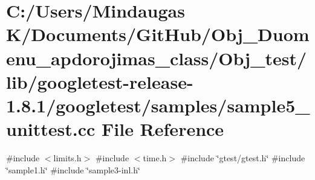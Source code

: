 \hypertarget{_obj__test_2lib_2googletest-release-1_88_81_2googletest_2samples_2sample5__unittest_8cc}{}\section{C\+:/\+Users/\+Mindaugas K/\+Documents/\+Git\+Hub/\+Obj\+\_\+\+Duomenu\+\_\+apdorojimas\+\_\+class/\+Obj\+\_\+test/lib/googletest-\/release-\/1.8.1/googletest/samples/sample5\+\_\+unittest.cc File Reference}
\label{_obj__test_2lib_2googletest-release-1_88_81_2googletest_2samples_2sample5__unittest_8cc}
{\ttfamily \#include $<$limits.\+h$>$}\newline
{\ttfamily \#include $<$time.\+h$>$}\newline
{\ttfamily \#include \char`\"{}gtest/gtest.\+h\char`\"{}}\newline
{\ttfamily \#include \char`\"{}sample1.\+h\char`\"{}}\newline
{\ttfamily \#include \char`\"{}sample3-\/inl.\+h\char`\"{}}\newline
